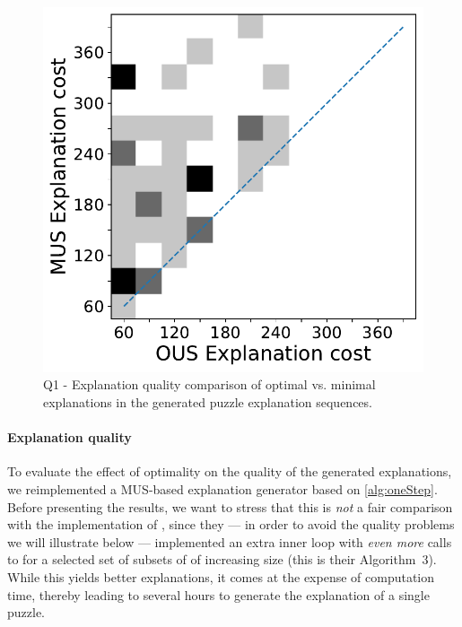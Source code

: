
\begin{figure}[t]
  \centering
  \includegraphics[width=0.6\columnwidth]{figures_post_paper/heatmap_costs_mus_cous.pdf}
  \caption{Q1 - Explanation quality comparison of optimal vs. minimal explanations in the generated puzzle explanation sequences.}
  \label{fig:rq1_heatmap}
\end{figure}


\paragraph{Explanation quality}\label{paragraph:explanationquality}
To evaluate the effect of optimality on the quality of the generated explanations, we reimplemented a MUS-based explanation generator based on \cref{alg:oneStep}. 
Before presenting the results, we want to stress that this is \emph{not} a fair comparison with the implementation of \citet{ecai/BogaertsGCG20}, since they --- in order to avoid the quality problems we will illustrate below --- implemented an extra inner loop with \emph{even more} calls to  for a selected set of subsets of \formulac of increasing size (this is their Algorithm~3). 
While this yields better explanations, it comes at the expense of computation time, thereby leading to several hours to generate the explanation of a single puzzle. 

